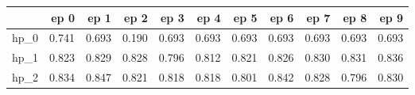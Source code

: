 \begin{tabular}{lrrrrrrrrrr}
\toprule
{} &   ep 0 &   ep 1 &   ep 2 &   ep 3 &   ep 4 &   ep 5 &   ep 6 &   ep 7 &   ep 8 &   ep 9 \\
\midrule
hp\_0 &  0.741 &  0.693 &  0.190 &  0.693 &  0.693 &  0.693 &  0.693 &  0.693 &  0.693 &  0.693 \\
hp\_1 &  0.823 &  0.829 &  0.828 &  0.796 &  0.812 &  0.821 &  0.826 &  0.830 &  0.831 &  0.836 \\
hp\_2 &  0.834 &  0.847 &  0.821 &  0.818 &  0.818 &  0.801 &  0.842 &  0.828 &  0.796 &  0.830 \\
\bottomrule
\end{tabular}
